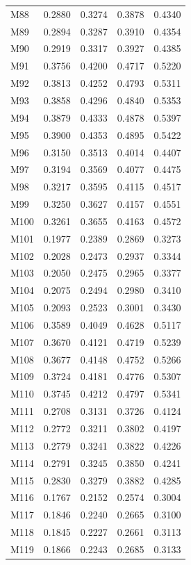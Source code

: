 \begin{longtable}{lrrrr}
M88 & 0.2880 & 0.3274 & 0.3878 & 0.4340 \\
M89 & 0.2894 & 0.3287 & 0.3910 & 0.4354 \\
M90 & 0.2919 & 0.3317 & 0.3927 & 0.4385 \\
M91 & 0.3756 & 0.4200 & 0.4717 & 0.5220 \\
M92 & 0.3813 & 0.4252 & 0.4793 & 0.5311 \\
M93 & 0.3858 & 0.4296 & 0.4840 & 0.5353 \\
M94 & 0.3879 & 0.4333 & 0.4878 & 0.5397 \\
M95 & 0.3900 & 0.4353 & 0.4895 & 0.5422 \\
M96 & 0.3150 & 0.3513 & 0.4014 & 0.4407 \\
M97 & 0.3194 & 0.3569 & 0.4077 & 0.4475 \\
M98 & 0.3217 & 0.3595 & 0.4115 & 0.4517 \\
M99 & 0.3250 & 0.3627 & 0.4157 & 0.4551 \\
M100 & 0.3261 & 0.3655 & 0.4163 & 0.4572 \\
M101 & 0.1977 & 0.2389 & 0.2869 & 0.3273 \\
M102 & 0.2028 & 0.2473 & 0.2937 & 0.3344 \\
M103 & 0.2050 & 0.2475 & 0.2965 & 0.3377 \\
M104 & 0.2075 & 0.2494 & 0.2980 & 0.3410 \\
M105 & 0.2093 & 0.2523 & 0.3001 & 0.3430 \\
M106 & 0.3589 & 0.4049 & 0.4628 & 0.5117 \\
M107 & 0.3670 & 0.4121 & 0.4719 & 0.5239 \\
M108 & 0.3677 & 0.4148 & 0.4752 & 0.5266 \\
M109 & 0.3724 & 0.4181 & 0.4776 & 0.5307 \\
M110 & 0.3745 & 0.4212 & 0.4797 & 0.5341 \\
M111 & 0.2708 & 0.3131 & 0.3726 & 0.4124 \\
M112 & 0.2772 & 0.3211 & 0.3802 & 0.4197 \\
M113 & 0.2779 & 0.3241 & 0.3822 & 0.4226 \\
M114 & 0.2791 & 0.3245 & 0.3850 & 0.4241 \\
M115 & 0.2830 & 0.3279 & 0.3882 & 0.4285 \\
M116 & 0.1767 & 0.2152 & 0.2574 & 0.3004 \\
M117 & 0.1846 & 0.2240 & 0.2665 & 0.3100 \\
M118 & 0.1845 & 0.2227 & 0.2661 & 0.3113 \\
M119 & 0.1866 & 0.2243 & 0.2685 & 0.3133 \\

\end{longtable}
